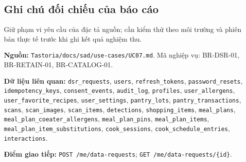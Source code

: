 \subsection{Ghi chú đối chiếu của báo cáo}
Giữ phạm vi yêu cầu của đặc tả nguồn; cần kiểm thử theo môi trường và phiên bản thực tế trước khi ghi kết quả nghiệm thu.

\textbf{Nguồn:} {\small\texttt{Tastoria/\allowbreak{}\allowbreak{}docs/\allowbreak{}\allowbreak{}sad/\allowbreak{}\allowbreak{}use-\allowbreak{}cases/\allowbreak{}\allowbreak{}UC07.\allowbreak{}md}}. Mã nghiệp vụ: BR-\allowbreak{}DSR-\allowbreak{}01, BR-\allowbreak{}RETAIN-\allowbreak{}01, BR-\allowbreak{}CATALOG-\allowbreak{}01.

\textbf{Dữ liệu liên quan:} {\small\texttt{dsr\_\allowbreak{}\allowbreak{}requests}}, {\small\texttt{users}}, {\small\texttt{refresh\_\allowbreak{}\allowbreak{}tokens}}, {\small\texttt{password\_\allowbreak{}\allowbreak{}resets}}, {\small\texttt{idempotency\_\allowbreak{}\allowbreak{}keys}}, {\small\texttt{consent\_\allowbreak{}\allowbreak{}events}}, {\small\texttt{audit\_\allowbreak{}\allowbreak{}log}}, {\small\texttt{profiles}}, {\small\texttt{user\_\allowbreak{}\allowbreak{}allergens}}, {\small\texttt{user\_\allowbreak{}\allowbreak{}favorite\_\allowbreak{}\allowbreak{}recipes}}, {\small\texttt{user\_\allowbreak{}\allowbreak{}settings}}, {\small\texttt{pantry\_\allowbreak{}\allowbreak{}lots}}, {\small\texttt{pantry\_\allowbreak{}\allowbreak{}transactions}}, {\small\texttt{scans}}, {\small\texttt{scan\_\allowbreak{}\allowbreak{}images}}, {\small\texttt{scan\_\allowbreak{}\allowbreak{}items}}, {\small\texttt{detections}}, {\small\texttt{shopping\_\allowbreak{}\allowbreak{}items}}, {\small\texttt{meal\_\allowbreak{}\allowbreak{}plans}}, {\small\texttt{meal\_\allowbreak{}\allowbreak{}plan\_\allowbreak{}\allowbreak{}coeater\_\allowbreak{}\allowbreak{}allergens}}, {\small\texttt{meal\_\allowbreak{}\allowbreak{}plan\_\allowbreak{}\allowbreak{}pins}}, {\small\texttt{meal\_\allowbreak{}\allowbreak{}plan\_\allowbreak{}\allowbreak{}items}}, {\small\texttt{meal\_\allowbreak{}\allowbreak{}plan\_\allowbreak{}\allowbreak{}item\_\allowbreak{}\allowbreak{}substitutions}}, {\small\texttt{cook\_\allowbreak{}\allowbreak{}sessions}}, {\small\texttt{cook\_\allowbreak{}\allowbreak{}schedule\_\allowbreak{}\allowbreak{}entries}}, {\small\texttt{interactions}}.

\textbf{Điểm giao tiếp:} {\small\texttt{POST /\allowbreak{}\allowbreak{}me/\allowbreak{}\allowbreak{}data-\allowbreak{}requests}}; {\small\texttt{GET /\allowbreak{}\allowbreak{}me/\allowbreak{}\allowbreak{}data-\allowbreak{}requests/\allowbreak{}\allowbreak{}\{id\}}}.

